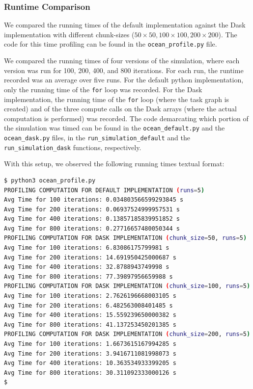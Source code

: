 \documentclass[a4paper,12pt]{article}
\begin{document}
\subsubsection{Runtime Comparison}
We compared the running times of the default implementation against the Dask implementation with different chunk-sizes ($50 \times 50, 100 \times 100, 200 \times 200$). The code for this time profiling can be found in the \verb|ocean_profile.py| file. 

We compared the running times of four versions of the simulation, where each version was run for 100, 200, 400, and 800 iterations.
For each run, the runtime recorded was an average over five runs.
For the default python implementation, only the running time of the \verb|for| loop was recorded.
For the Dask implementation, the running time of the \verb|for| loop (where the task graph is created) and of the three compute calls on the Dask arrays (where the actual computation is performed) was recorded.
The code demarcating which portion of the simulation was timed can be found in the \verb|ocean_default.py| and the \verb|ocean_dask.py| files, in the \verb|run_simulation_default| and the \verb|run_simulation_dask| functions, respectively.

With this setup, we observed the following running times textual format: 

\begin{lstlisting}[language=bash,basicstyle=\tiny\ttfamily]
$ python3 ocean_profile.py
PROFILING COMPUTATION FOR DEFAULT IMPLEMENTATION (runs=5)
Avg Time for 100 iterations: 0.034803566599293845 s 
Avg Time for 200 iterations: 0.06937524999957531 s 
Avg Time for 400 iterations: 0.13857185839951852 s 
Avg Time for 800 iterations: 0.27716657480050344 s 
PROFILING COMPUTATION FOR DASK IMPLEMENTATION (chunk_size=50, runs=5)
Avg Time for 100 iterations: 6.83086175799981 s 
Avg Time for 200 iterations: 14.691950425000687 s 
Avg Time for 400 iterations: 32.8788943749998 s 
Avg Time for 800 iterations: 77.39897956659988 s 
PROFILING COMPUTATION FOR DASK IMPLEMENTATION (chunk_size=100, runs=5)
Avg Time for 100 iterations: 2.7626196668003105 s 
Avg Time for 200 iterations: 6.482563008401485 s 
Avg Time for 400 iterations: 15.559239650000382 s 
Avg Time for 800 iterations: 41.137253450201385 s 
PROFILING COMPUTATION FOR DASK IMPLEMENTATION (chunk_size=200, runs=5)
Avg Time for 100 iterations: 1.6673615167994285 s 
Avg Time for 200 iterations: 3.9416711081998073 s 
Avg Time for 400 iterations: 10.363534933399205 s 
Avg Time for 800 iterations: 30.311092333000126 s 
$
\end{lstlisting}
\end{document}
